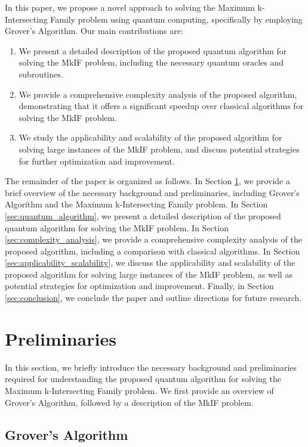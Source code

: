 In this paper, we propose a novel approach to solving the Maximum k-Intersecting Family problem using quantum computing, specifically by employing Grover's Algorithm. Our main contributions are:

\begin{enumerate}
    \item We present a detailed description of the proposed quantum algorithm for solving the MkIF problem, including the necessary quantum oracles and subroutines.
    \item We provide a comprehensive complexity analysis of the proposed algorithm, demonstrating that it offers a significant speedup over classical algorithms for solving the MkIF problem.
    \item We study the applicability and scalability of the proposed algorithm for solving large instances of the MkIF problem, and discuss potential strategies for further optimization and improvement.
\end{enumerate}

The remainder of the paper is organized as follows. In Section \ref{sec:preliminaries}, we provide a brief overview of the necessary background and preliminaries, including Grover's Algorithm and the Maximum k-Intersecting Family problem. In Section \ref{sec:quantum_algorithm}, we present a detailed description of the proposed quantum algorithm for solving the MkIF problem. In Section \ref{sec:complexity_analysis}, we provide a comprehensive complexity analysis of the proposed algorithm, including a comparison with classical algorithms. In Section \ref{sec:applicability_scalability}, we discuss the applicability and scalability of the proposed algorithm for solving large instances of the MkIF problem, as well as potential strategies for optimization and improvement. Finally, in Section \ref{sec:conclusion}, we conclude the paper and outline directions for future research.

\section{Preliminaries}
\label{sec:preliminaries}

In this section, we briefly introduce the necessary background and preliminaries required for understanding the proposed quantum algorithm for solving the Maximum k-Intersecting Family problem. We first provide an overview of Grover's Algorithm, followed by a description of the MkIF problem.

\subsection{Grover's Algorithm}
\label{subsec:grover_algorithm}

